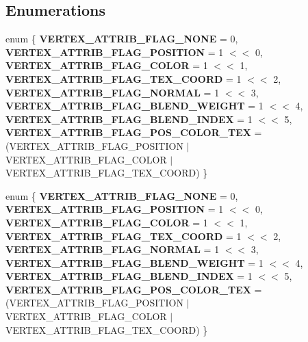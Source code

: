 \subsection*{Enumerations}
\begin{DoxyCompactItemize}
\item 
enum \{ \newline
{\bfseries V\+E\+R\+T\+E\+X\+\_\+\+A\+T\+T\+R\+I\+B\+\_\+\+F\+L\+A\+G\+\_\+\+N\+O\+NE} = 0, 
{\bfseries V\+E\+R\+T\+E\+X\+\_\+\+A\+T\+T\+R\+I\+B\+\_\+\+F\+L\+A\+G\+\_\+\+P\+O\+S\+I\+T\+I\+ON} = 1 $<$$<$ 0, 
{\bfseries V\+E\+R\+T\+E\+X\+\_\+\+A\+T\+T\+R\+I\+B\+\_\+\+F\+L\+A\+G\+\_\+\+C\+O\+L\+OR} = 1 $<$$<$ 1, 
{\bfseries V\+E\+R\+T\+E\+X\+\_\+\+A\+T\+T\+R\+I\+B\+\_\+\+F\+L\+A\+G\+\_\+\+T\+E\+X\+\_\+\+C\+O\+O\+RD} = 1 $<$$<$ 2, 
\newline
{\bfseries V\+E\+R\+T\+E\+X\+\_\+\+A\+T\+T\+R\+I\+B\+\_\+\+F\+L\+A\+G\+\_\+\+N\+O\+R\+M\+AL} = 1 $<$$<$ 3, 
{\bfseries V\+E\+R\+T\+E\+X\+\_\+\+A\+T\+T\+R\+I\+B\+\_\+\+F\+L\+A\+G\+\_\+\+B\+L\+E\+N\+D\+\_\+\+W\+E\+I\+G\+HT} = 1 $<$$<$ 4, 
{\bfseries V\+E\+R\+T\+E\+X\+\_\+\+A\+T\+T\+R\+I\+B\+\_\+\+F\+L\+A\+G\+\_\+\+B\+L\+E\+N\+D\+\_\+\+I\+N\+D\+EX} = 1 $<$$<$ 5, 
{\bfseries V\+E\+R\+T\+E\+X\+\_\+\+A\+T\+T\+R\+I\+B\+\_\+\+F\+L\+A\+G\+\_\+\+P\+O\+S\+\_\+\+C\+O\+L\+O\+R\+\_\+\+T\+EX} = (V\+E\+R\+T\+E\+X\+\_\+\+A\+T\+T\+R\+I\+B\+\_\+\+F\+L\+A\+G\+\_\+\+P\+O\+S\+I\+T\+I\+ON $\vert$ V\+E\+R\+T\+E\+X\+\_\+\+A\+T\+T\+R\+I\+B\+\_\+\+F\+L\+A\+G\+\_\+\+C\+O\+L\+OR $\vert$ V\+E\+R\+T\+E\+X\+\_\+\+A\+T\+T\+R\+I\+B\+\_\+\+F\+L\+A\+G\+\_\+\+T\+E\+X\+\_\+\+C\+O\+O\+RD)
 \}
\item 
enum \{ \newline
{\bfseries V\+E\+R\+T\+E\+X\+\_\+\+A\+T\+T\+R\+I\+B\+\_\+\+F\+L\+A\+G\+\_\+\+N\+O\+NE} = 0, 
{\bfseries V\+E\+R\+T\+E\+X\+\_\+\+A\+T\+T\+R\+I\+B\+\_\+\+F\+L\+A\+G\+\_\+\+P\+O\+S\+I\+T\+I\+ON} = 1 $<$$<$ 0, 
{\bfseries V\+E\+R\+T\+E\+X\+\_\+\+A\+T\+T\+R\+I\+B\+\_\+\+F\+L\+A\+G\+\_\+\+C\+O\+L\+OR} = 1 $<$$<$ 1, 
{\bfseries V\+E\+R\+T\+E\+X\+\_\+\+A\+T\+T\+R\+I\+B\+\_\+\+F\+L\+A\+G\+\_\+\+T\+E\+X\+\_\+\+C\+O\+O\+RD} = 1 $<$$<$ 2, 
\newline
{\bfseries V\+E\+R\+T\+E\+X\+\_\+\+A\+T\+T\+R\+I\+B\+\_\+\+F\+L\+A\+G\+\_\+\+N\+O\+R\+M\+AL} = 1 $<$$<$ 3, 
{\bfseries V\+E\+R\+T\+E\+X\+\_\+\+A\+T\+T\+R\+I\+B\+\_\+\+F\+L\+A\+G\+\_\+\+B\+L\+E\+N\+D\+\_\+\+W\+E\+I\+G\+HT} = 1 $<$$<$ 4, 
{\bfseries V\+E\+R\+T\+E\+X\+\_\+\+A\+T\+T\+R\+I\+B\+\_\+\+F\+L\+A\+G\+\_\+\+B\+L\+E\+N\+D\+\_\+\+I\+N\+D\+EX} = 1 $<$$<$ 5, 
{\bfseries V\+E\+R\+T\+E\+X\+\_\+\+A\+T\+T\+R\+I\+B\+\_\+\+F\+L\+A\+G\+\_\+\+P\+O\+S\+\_\+\+C\+O\+L\+O\+R\+\_\+\+T\+EX} = (V\+E\+R\+T\+E\+X\+\_\+\+A\+T\+T\+R\+I\+B\+\_\+\+F\+L\+A\+G\+\_\+\+P\+O\+S\+I\+T\+I\+ON $\vert$ V\+E\+R\+T\+E\+X\+\_\+\+A\+T\+T\+R\+I\+B\+\_\+\+F\+L\+A\+G\+\_\+\+C\+O\+L\+OR $\vert$ V\+E\+R\+T\+E\+X\+\_\+\+A\+T\+T\+R\+I\+B\+\_\+\+F\+L\+A\+G\+\_\+\+T\+E\+X\+\_\+\+C\+O\+O\+RD)
 \}
\end{DoxyCompactItemize}

